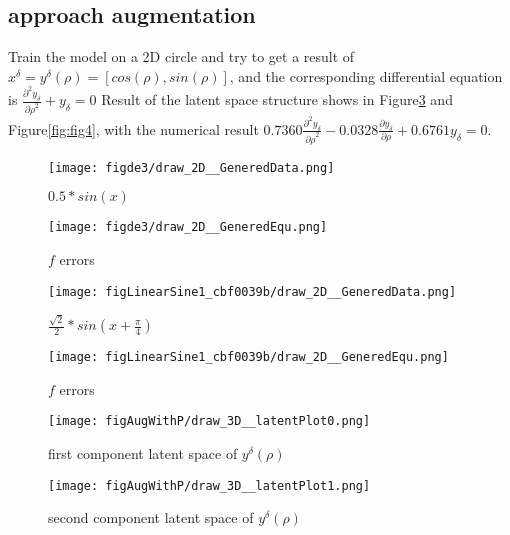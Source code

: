 \documentclass{article}
\begin{document}
\subsection{approach augmentation}
Train the model on a 2D circle and try to
get a result of $x^\delta=y^\delta(\rho)=[cos(\rho),sin(\rho)]$,
and the corresponding differential equation is
$\frac{\partial^2 y_\delta}{{\partial \rho}^2}+y_\delta=0$
Result of the latent space structure shows in Figure\ref{fig:fig3} and Figure\ref{fig:fig4}, with the
numerical result $0.7360\frac{\partial^2 y_\delta}{{\partial \rho}^2}-0.0328\frac{\partial y_\delta}{{\partial \rho}}+  0.6761y_\delta=0$.

\begin{figure}[ht!]
    \centering
    \begin{minipage}{0.45\textwidth}
        \centering
        \texttt{[image: figde3/draw\_2D\_\_GeneredData.png]} %
        \caption{$0.5*sin(x)$}
        \label{fig:fig1}
    \end{minipage}\hfill
    \begin{minipage}{0.45\textwidth}
        \centering
        \texttt{[image: figde3/draw\_2D\_\_GeneredEqu.png]} %
        \caption{$f$ errors}
    \end{minipage}
\end{figure}
\begin{figure}[ht!]
    \centering
    \begin{minipage}{0.45\textwidth}
        \centering
        \texttt{[image: figLinearSine1\_cbf0039b/draw\_2D\_\_GeneredData.png]} %
        \caption{$\frac{\sqrt{2}}{2}*sin(x+\frac{\pi}{4})$}
        \label{fig:fig2}
    \end{minipage}\hfill
    \begin{minipage}{0.45\textwidth}
        \centering
        \texttt{[image: figLinearSine1\_cbf0039b/draw\_2D\_\_GeneredEqu.png]} %
        \caption{$f$ errors}
    \end{minipage}
\end{figure}
\begin{figure}[ht!]
    \centering
    \begin{minipage}{0.45\textwidth}
        \centering
        \texttt{[image: figAugWithP/draw\_3D\_\_latentPlot0.png]} %
        \caption{first component latent space of $y^\delta(\rho)$}
        \label{fig:fig3}
    \end{minipage}\hfill
    \begin{minipage}{0.45\textwidth}
        \centering
        \texttt{[image: figAugWithP/draw\_3D\_\_latentPlot1.png]} %
        \caption{second component latent space of $y^\delta(\rho)$}
    \end{minipage}
\end{figure}
\end{document}
